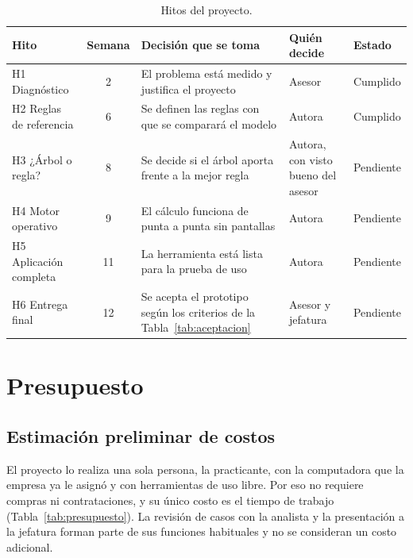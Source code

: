 \begin{table}[htbp]
\centering
\caption{Hitos del proyecto.}
\label{tab:hitos}
\small
\begin{tabularx}{\textwidth}{@{}lcYL{2.6cm}l@{}}
\toprule
\textbf{Hito} & \textbf{Semana} & \textbf{Decisión que se toma} & \textbf{Quién decide} & \textbf{Estado} \\
\midrule
H1 Diagnóstico & 2 & El problema está medido y justifica el proyecto & Asesor & Cumplido \\
H2 Reglas de referencia & 6 & Se definen las reglas con que se comparará el modelo & Autora & Cumplido \\
H3 ¿Árbol o regla? & 8 & Se decide si el árbol aporta frente a la mejor regla & Autora, con visto bueno del asesor & Pendiente \\
H4 Motor operativo & 9 & El cálculo funciona de punta a punta sin pantallas & Autora & Pendiente \\
H5 Aplicación completa & 11 & La herramienta está lista para la prueba de uso & Autora & Pendiente \\
H6 Entrega final & 12 & Se acepta el prototipo según los criterios de la Tabla~\ref{tab:aceptacion} & Asesor y jefatura & Pendiente \\
\bottomrule
\end{tabularx}
\end{table}

\section{Presupuesto}
\label{sec:presupuesto}

\subsection{Estimación preliminar de costos}

El proyecto lo realiza una sola persona, la practicante, con la computadora que la empresa ya le asignó y con herramientas de uso libre. Por eso no requiere compras ni contrataciones, y su único costo es el tiempo de trabajo (Tabla~\ref{tab:presupuesto}). La revisión de casos con la analista y la presentación a la jefatura forman parte de sus funciones habituales y no se consideran un costo adicional.


